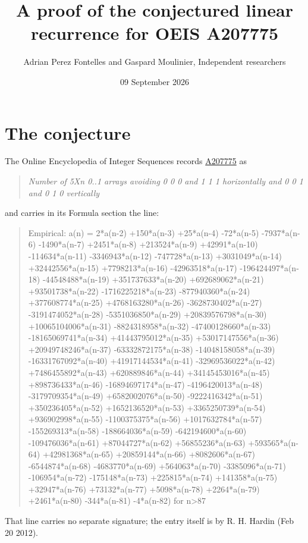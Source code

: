 \documentclass[11pt]{article}
\title{A proof of the conjectured linear recurrence for OEIS A207775}
\author{Adrian Perez Fontelles and Gaspard Moulinier, Independent researchers}
\date{09 September 2026}
\theoremstyle{definition}
\begin{document}
\maketitle
\section{The conjecture}

The Online Encyclopedia of Integer Sequences records \href{https://oeis.org/A207775}{A207775} as

\begin{quote}\itshape Number of 5Xn 0..1 arrays avoiding 0 0 0 and 1 1 1 horizontally and 0 0 1 and 0 1 0 vertically\end{quote}

and carries in its Formula section the line:

\begin{quote}\ttfamily Empirical: a(n) = 2*a(n-2) +150*a(n-3) +25*a(n-4) -72*a(n-5) -7937*a(n-6) -1490*a(n-7) +2451*a(n-8) +213524*a(n-9) +42991*a(n-10) -114634*a(n-11) -3346943*a(n-12) -747728*a(n-13) +3031049*a(n-14) +32442556*a(n-15) +7798213*a(n-16) -42963518*a(n-17) -196424497*a(n-18) -44548488*a(n-19) +351737633*a(n-20) +692689062*a(n-21) +93501738*a(n-22) -1716225218*a(n-23) -877940360*a(n-24) +377608774*a(n-25) +4768163280*a(n-26) -3628730402*a(n-27) -3191474052*a(n-28) -5351036850*a(n-29) +20839576798*a(n-30) +10065104006*a(n-31) -8824318958*a(n-32) -47400128660*a(n-33) -18165069741*a(n-34) +41443795012*a(n-35) +53017147556*a(n-36) +20949748246*a(n-37) -63332872175*a(n-38) -14048158058*a(n-39) -16331767092*a(n-40) +41917144534*a(n-41) -32969536022*a(n-42) +7486455892*a(n-43) +620889846*a(n-44) +34145453016*a(n-45) +898736433*a(n-46) -16894697174*a(n-47) -4196420013*a(n-48) -3179709354*a(n-49) +6582002076*a(n-50) -9222416342*a(n-51) +350236405*a(n-52) +1652136520*a(n-53) +3365250739*a(n-54) +936902998*a(n-55) -1100375375*a(n-56) +1017632784*a(n-57) -155269313*a(n-58) -188664036*a(n-59) -642194600*a(n-60) -109476036*a(n-61) +87044727*a(n-62) +56855236*a(n-63) +593565*a(n-64) +42981368*a(n-65) +20859144*a(n-66) +8082606*a(n-67) -6544874*a(n-68) -4683770*a(n-69) +564063*a(n-70) -3385096*a(n-71) -106954*a(n-72) -175148*a(n-73) +225815*a(n-74) +141358*a(n-75) +32947*a(n-76) +73132*a(n-77) +5098*a(n-78) +2264*a(n-79) +2461*a(n-80) -344*a(n-81) -4*a(n-82) for n>87\end{quote}

That line carries no separate signature; the entry itself is by R. H. Hardin (Feb 20 2012).
\end{document}
